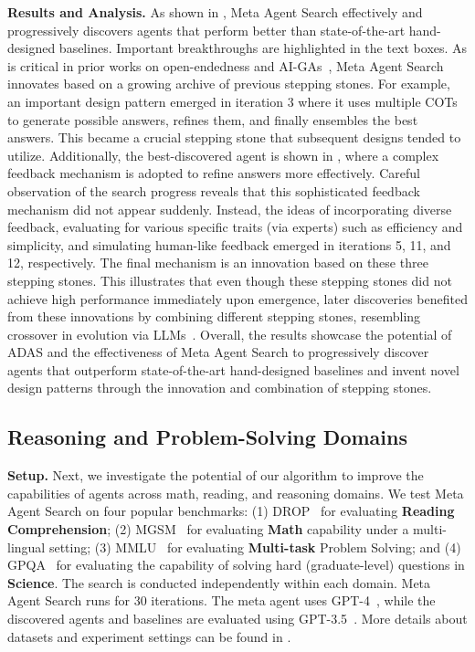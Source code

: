 \documentclass{article} %
\newcommand{\problem}{ADAS\xspace}
\newcommand{\ouralgo}{Meta Agent Search\xspace}
\begin{document}
\noindent\textbf{Results and Analysis.}\hspace{0.5em} As shown in , \ouralgo effectively and progressively discovers agents that perform better than state-of-the-art hand-designed baselines.
Important breakthroughs are highlighted in the text boxes.
As is critical in prior works on open-endedness and AI-GAs~\citep{zhang2024omni,faldor2024omni,wang2019poet,wang2020enhanced,lehman2011abandoning}, \ouralgo innovates based on a growing archive of previous stepping stones.
For example, an important design pattern emerged in iteration 3 where it uses multiple COTs to generate possible answers, refines them, and finally ensembles the best answers.
This became a crucial stepping stone that subsequent designs tended to utilize.
Additionally, the best-discovered agent is shown in , where a complex feedback mechanism is adopted to refine answers more effectively.
Careful observation of the search progress reveals that this sophisticated feedback mechanism did not appear suddenly. 
Instead, the ideas of incorporating diverse feedback, evaluating for various specific traits (via experts) such as efficiency and simplicity, and simulating human-like feedback emerged in iterations 5, 11, and 12, respectively.
The final mechanism is an innovation based on these three stepping stones.
This illustrates that even though these stepping stones did not achieve high performance immediately upon emergence, later discoveries benefited from these innovations by combining different stepping stones, resembling crossover in evolution via LLMs~\citep{meyerson2023lmx}.
Overall, the results showcase the potential of \problem and the effectiveness of \ouralgo to progressively discover agents that outperform state-of-the-art hand-designed baselines and invent novel design patterns through the innovation and combination of stepping stones.

\subsection{Reasoning and Problem-Solving Domains}

\label{section:expr_four_main_domains}


\noindent\textbf{Setup.} \hspace{0.5em} Next, we investigate the potential of our algorithm to improve the capabilities of agents across math, reading, and reasoning domains. We test \ouralgo on four popular benchmarks: (1) DROP~\citep{dua-2019-drop} for evaluating \textbf{Reading Comprehension}; (2) MGSM~\citep{shi2023language} for evaluating \textbf{Math} capability under a multi-lingual setting; (3) MMLU~\citep{hendrycks2021mmlu} for evaluating \textbf{Multi-task} Problem Solving; and (4) GPQA~\citep{rein2023gpqa} for evaluating the capability of solving hard (graduate-level) questions in \textbf{Science}. The search is conducted independently within each domain. \ouralgo runs for 30 iterations. The meta agent uses GPT-4~\citep{openai2024gpt4}, while the discovered agents and baselines are evaluated using GPT-3.5~\citep{openai_gpt3.5}. More details about datasets and experiment settings can be found in .
\end{document}
